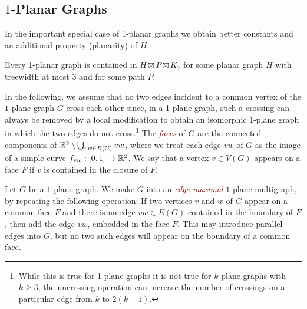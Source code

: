 \documentclass{patmorin}
\newcommand{\defin}[1]{\textcolor{Maroon}{\emph{#1}}}
\newcommand{\note}[2]{\noindent{\color{red}[#1:~#2]}}
\renewcommand{\ge}{\geqslant}
\begin{document}
\subsection{\boldmath  $1$-Planar Graphs}
\label{sec-1-planar}

In the important special case of 1-planar graphs we obtain better constants and an additional property (planarity) of $H$.

%
%

\begin{thm}
\label{1-planar}
Every 1-planar graph is contained in $H\boxtimes P\boxtimes K_{7}$ for some planar graph $H$ with treewidth at most 3 and for some path $P$.
\end{thm}


In the following, we assume that no two edges incident to a common vertex of the $1$-plane graph $G$ cross each other since, in a 1-plane graph, such a crossing can always be removed by a local modification to obtain an isomorphic 1-plane graph in which the two edges do not cross.\footnote{While this is true for 1-plane graphs it is not true for $k$-plane graphs with $k\ge 3$; the uncrossing operation can increase the number of crossings on a particular edge from $k$ to $2(k-1)$.}  The \defin{faces} of $G$ are the connected components of $\mathbb{R}^2\setminus \bigcup_{vw\in E(G)} vw$, where we treat each edge $vw$ of $G$ as the image of a simple curve $f_{vw}:[0,1]\to\mathbb{R}^2$.  We say that a vertex $v\in V(G)$ appears on a face $F$ if $v$ is contained in the closure of $F$.

Let $G$ be a $1$-plane graph.  We make $G$ into an \defin{edge-maximal} $1$-plane multigraph, by repeating the following operation:  If two vertices $v$ and $w$ of $G$ appear on a common face $F$ and there is no edge $vw\in E(G)$ contained in the boundary of $F$, then add the edge $vw$, embedded in the face $F$.  This may introduce parallel edges into $G$, but no two such edges will appear on the boundary of a common face.
\end{document}
